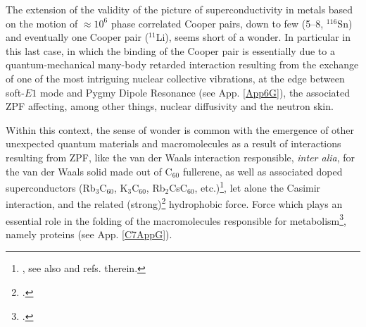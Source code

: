 \begin{subappendices}
 The extension of the validity of the picture of superconductivity in metals based on the motion of $\approx10^{6}$ phase correlated Cooper pairs, down to few (5--8, $^{116}$Sn) and eventually  one Cooper pair ($^{11}$Li), seems short of a wonder. In particular in this last case, in which the binding of the Cooper pair is essentially due to a  quantum-mechanical many-body retarded interaction resulting from the exchange of one of the most intriguing nuclear collective vibrations, at the edge between soft-$E1$ mode and Pygmy Dipole Resonance (see App. \ref{App6G}), the associated ZPF affecting, among other things, nuclear diffusivity and the neutron skin.
 
 Within this context, the sense of wonder is common with the emergence of other unexpected quantum materials and macromolecules as a result of interactions resulting from ZPF, like the van der Waals interaction responsible, \textit{inter alia}, for the van der Waals solid made out of C$_{60}$ fullerene, as well as associated doped superconductors (Rb$_3$C$_{60}$, K$_3$C$_{60}$, Rb$_2$CsC$_{60}$, etc.)\footnote{\cite{Hebard:91,Rosseinsky:91,Holczer:91,Fleming:91,Anderson:91,Zhou:92,Hebard:92,Gunnarsson:95,Gunnarsson:97,Gunnarsson:04}, see also \cite{Broglia:04b} and refs. therein.}, let alone the Casimir interaction, and the related (strong)\footnote{\cite{Chandler:02}.} hydrophobic force. Force which plays an essential role in the folding of the macromolecules responsible for metabolism\footnote{\cite{Dyson:99}.}, namely proteins (see App. \ref{C7AppG}).



\end{subappendices}
